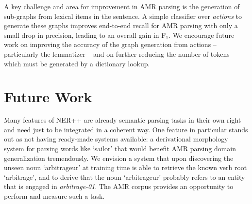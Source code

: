 \documentclass[11pt]{article}
\newcommand\n[1]{\textit{#1}} %
\begin{document}

A key challenge and area for improvement in AMR parsing is the
  generation of sub-graphs from lexical items in the sentence.
A simple classifier over \textit{actions} to generate
  these graphs improves end-to-end recall for AMR parsing with only a small
  drop in precision, leading to an overall gain in F$_1$.
We encourage future work on improving the accuracy of the graph generation from
  actions -- particularly the lemmatizer -- and on further reducing the number of
  tokens which must be generated by a dictionary lookup.

\section{Future Work}

Many features of NER++ are already semantic parsing tasks in their own right and need just to be integrated in a coherent way. One feature in particular stands out as not having ready-made systems available: a derivational morphology system for parsing words like `sailor' that would benefit AMR parsing domain generalization tremendously. We envision a system that upon discovering the unseen noun `arbitrageur' at training time is able to retrieve the known verb root `arbitrage', and to derive that the noun `arbitrageur' probably refers to an entity that is engaged in \n{arbitrage-01}. The AMR corpus provides an opportunity to perform and measure such a task.






\end{document}
